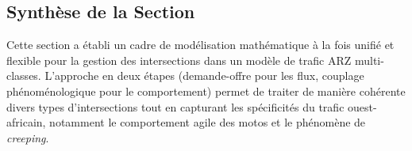 

\subsection{Synthèse de la Section}
Cette section a établi un cadre de modélisation mathématique à la fois unifié et flexible pour la gestion des intersections dans un modèle de trafic ARZ multi-classes. L'approche en deux étapes (demande-offre pour les flux, couplage phénoménologique pour le comportement) permet de traiter de manière cohérente divers types d'intersections tout en capturant les spécificités du trafic ouest-africain, notamment le comportement agile des motos et le phénomène de \textit{creeping}.

